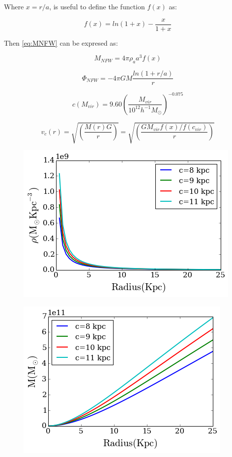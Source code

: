 Where $x = r/a$, is useful to define the function $f(x)$ as:

\begin{equation}
f(x) = ln(1 + x) - \frac{x}{1 + x} 
\end{equation}

Then \ref{eq:MNFW} can be expresed as:

\begin{equation}\label{eq:M2NFW}
M_{NFW} = 4 \pi \rho_a a^3 f(x)
\end{equation}

\begin{equation}\label{PhiNFW}
\Phi_{NFW} = -4\pi G M \frac{ln(1 + r/a)}{r}
\end{equation}

\begin{equation}\label{eq:cnfwz0}
c(M_{vir}) = 9.60  \left( \frac{M_{vir}}{10^{12}h^{-1}M_{\odot}} \right)^{-0.075}
\end{equation}



\begin{equation}\label{vcNFW}
v_c(r) = \sqrt{\left(\dfrac{M(r)G}{r}\right)} = \sqrt{\left( \dfrac{G M_{vir}  f(x) / f(c_{vir})}{r} \right)}
\end{equation}


\begin{figure}[H]
\centering
\includegraphics[scale=0.7]{../figures/NFW_density.png}
\end{figure}

\begin{figure}[H]
\centering
\includegraphics[scale=0.7]{../figures/NFW_mass.png}
\end{figure}

